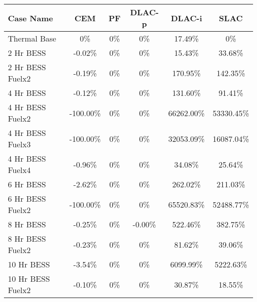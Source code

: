 \begin{tabular}{lccccc}
\toprule
Case Name & CEM & PF & DLAC-p & DLAC-i & SLAC \\
\midrule
Thermal Base & 0\% & 0\% & 0\% & 17.49\% & 0\% \\
2 Hr BESS & -0.02\% & 0\% & 0\% & 15.43\% & 33.68\% \\
2 Hr BESS Fuelx2 & -0.19\% & 0\% & 0\% & 170.95\% & 142.35\% \\
4 Hr BESS & -0.12\% & 0\% & 0\% & 131.60\% & 91.41\% \\
4 Hr BESS Fuelx2 & -100.00\% & 0\% & 0\% & 66262.00\% & 53330.45\% \\
4 Hr BESS Fuelx3 & -100.00\% & 0\% & 0\% & 32053.09\% & 16087.04\% \\
4 Hr BESS Fuelx4 & -0.96\% & 0\% & 0\% & 34.08\% & 25.64\% \\
6 Hr BESS & -2.62\% & 0\% & 0\% & 262.02\% & 211.03\% \\
6 Hr BESS Fuelx2 & -100.00\% & 0\% & 0\% & 65520.83\% & 52488.77\% \\
8 Hr BESS & -0.25\% & 0\% & -0.00\% & 522.46\% & 382.75\% \\
8 Hr BESS Fuelx2 & -0.23\% & 0\% & 0\% & 81.62\% & 39.06\% \\
10 Hr BESS & -3.54\% & 0\% & 0\% & 6099.99\% & 5222.63\% \\
10 Hr BESS Fuelx2 & -0.10\% & 0\% & 0\% & 30.87\% & 18.55\% \\
\bottomrule
\end{tabular}

